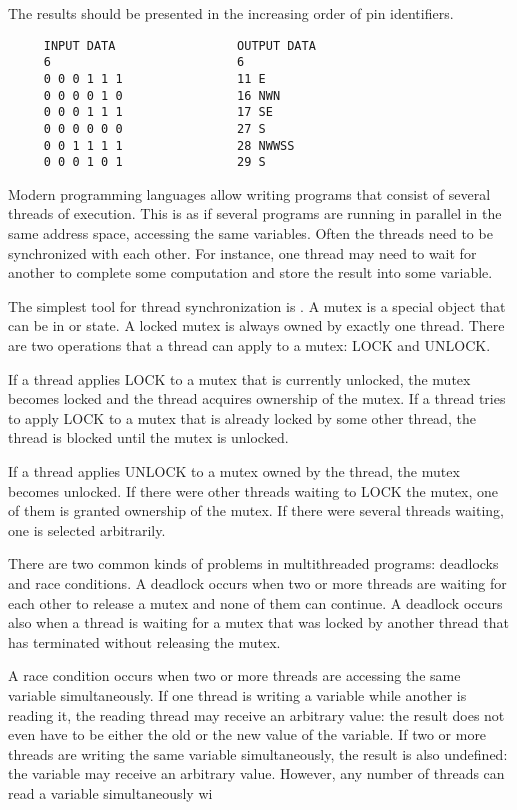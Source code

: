 The results should be presented in the increasing order of pin identifiers.

\begin{verbatim}
     INPUT DATA                 OUTPUT DATA
     6                          6
     0 0 0 1 1 1                11 E
     0 0 0 0 1 0                16 NWN
     0 0 0 1 1 1                17 SE
     0 0 0 0 0 0                27 S
     0 0 1 1 1 1                28 NWWSS
     0 0 0 1 0 1                29 S
\end{verbatim}
\newpage
Modern programming languages allow writing programs that consist of several threads
of execution. This is as if several programs are running in parallel in the same
address space, accessing the same variables. Often the threads need to be synchronized
with each other. For instance, one thread may need to wait for another to complete some
computation and store the result into some variable.

The simplest tool for thread synchronization is . A mutex is a special object that
can be in  or  state. A locked mutex is always owned by exactly
one thread. There are two operations that a thread can apply to a mutex: LOCK and UNLOCK.

If a thread applies LOCK to a mutex that is currently unlocked, the mutex becomes
locked and the thread acquires ownership of the mutex. If a thread tries to apply
LOCK to a mutex that is already locked by some other thread, the thread is blocked
until the mutex is unlocked.

If a thread applies UNLOCK to a mutex owned by the thread, the mutex becomes unlocked.
If there were other threads waiting to LOCK the mutex, one of them is granted ownership
of the mutex. If there were several threads waiting, one is selected arbitrarily.

There are two common kinds of problems in multithreaded programs: deadlocks and race
conditions. A deadlock occurs when two or more threads are waiting for each other to
release a mutex and none of them can continue. A deadlock occurs also when a thread is
waiting for a mutex that was locked by another thread that has terminated without
releasing the mutex.

A race condition occurs when two or more threads are accessing the same variable
simultaneously. If one thread is writing a variable while another is reading it,
the reading thread may receive an arbitrary value: the result does not even have to
be either the old or the new value of the variable. If two or more threads are writing
the same variable simultaneously, the result is also undefined: the variable may
receive an arbitrary value. However, any number of threads can read a variable
simultaneously wi

